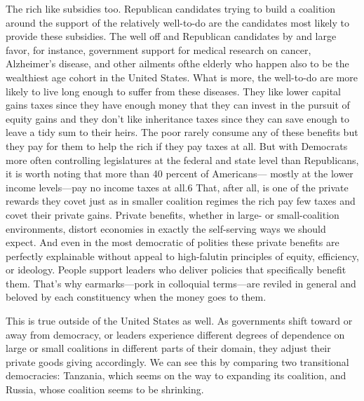 \documentclass[10pt]{article}
\begin{document}
{\large The rich like subsidies too. Republican candidates trying to build a
coalition around the support of the relatively well-to-do are the candidates most
likely to provide these subsidies. The well off and Republican candidates by and
large favor, for instance, government support for medical research on cancer,
Alzheimer's disease, and other ailments ofthe elderly who happen also to be the
wealthiest age cohort in the United States. What is more, the well-to-do are more
likely to live long enough to suffer from these diseases. They like lower capital
gains taxes since they have enough money that they can invest in the pursuit of
equity gains and they don't like inheritance taxes since they can save enough to
leave a tidy sum to their heirs. The poor rarely consume any of these benefits
but they pay for them to help the rich if they pay taxes at all. But with
Democrats more often controlling legislatures at the federal and state level than
Republicans, it is worth noting that more than 40 percent of Americans--- mostly
at the lower income levels---pay no income taxes at all.6 That, after all, is one
of the private rewards they covet just as in smaller coalition regimes the rich
pay few taxes and covet their private gains. Private benefits, whether in large-
or small-coalition environments, distort economies in exactly the self-serving
ways we should expect. And even in the most democratic of polities these private
benefits are perfectly explainable without appeal to high-falutin principles of
equity, efficiency, or ideology. People support leaders who deliver policies that
specifically benefit them. That's why earmarks---pork in colloquial terms---are
reviled in general and beloved by each constituency when the money goes to them.}

{\large This is true outside of the United States as well. As governments shift
toward or away from democracy, or leaders experience different degrees of
dependence on large or small coalitions in different parts of their domain, they
adjust their private goods giving accordingly. We can see this by comparing two
transitional democracies: Tanzania, which seems on the way to expanding its
coalition, and Russia, whose coalition seems to be shrinking.}
\end{document}
